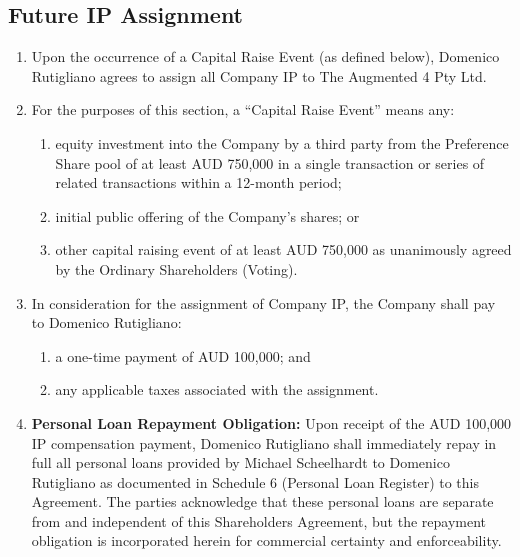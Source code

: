 \subsection{Future IP Assignment}
\begin{enumerate}[label=(\alph*)]
\item Upon the occurrence of a Capital Raise Event (as defined below), Domenico Rutigliano agrees to assign all Company IP to The Augmented 4 Pty Ltd.

\item For the purposes of this section, a ``Capital Raise Event'' means any:
    \begin{enumerate}[label=(\roman*)]
    \item equity investment into the Company by a third party from the Preference Share pool of at least AUD 750,000 in a single transaction or series of related transactions within a 12-month period;
    \item initial public offering of the Company's shares; or
    \item other capital raising event of at least AUD 750,000 as unanimously agreed by the Ordinary Shareholders (Voting).
    \end{enumerate}

\item In consideration for the assignment of Company IP, the Company shall pay to Domenico Rutigliano:
    \begin{enumerate}[label=(\roman*)]
    \item a one-time payment of AUD 100,000; and
    \item any applicable taxes associated with the assignment.
    \end{enumerate}

\item \textbf{Personal Loan Repayment Obligation:} Upon receipt of the AUD 100,000 IP compensation payment, Domenico Rutigliano shall immediately repay in full all personal loans provided by Michael Scheelhardt to Domenico Rutigliano as documented in Schedule 6 (Personal Loan Register) to this Agreement. The parties acknowledge that these personal loans are separate from and independent of this Shareholders Agreement, but the repayment obligation is incorporated herein for commercial certainty and enforceability.


\end{enumerate}
